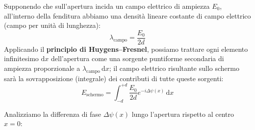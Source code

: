 \documentclass[openany,a4paper,12pt]{book}
\begin{document}
Supponendo che sull'apertura incida un campo elettrico di ampiezza $E_0$, all'interno della fenditura abbiamo una densità lineare costante di campo elettrico (campo per unità di lunghezza):
\[
    \lambda_{\text{campo}} = \frac{E_0}{2d}
\]
Applicando il \textbf{principio di Huygens--Fresnel}, possiamo trattare ogni elemento infinitesimo $\mathrm{d}x$ dell'apertura come una sorgente puntiforme secondaria di ampiezza proporzionale a $\lambda_{\text{campo}}\,\mathrm{d}x$; il campo elettrico risultante sullo schermo sarà la sovrapposizione (integrale) dei contributi di tutte queste sorgenti:
\begin{equation}
    E_{\text{schermo}} = \int_{-d}^{+d} \frac{E_0}{2d} e^{-i \Delta\psi(x)} \,\mathrm{d}x
\end{equation}

Analizziamo la differenza di fase $\Delta\psi(x)$ lungo l'apertura rispetto al centro $x = 0$:
\end{document}
